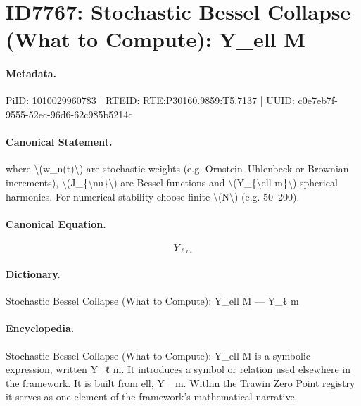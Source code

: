 \section*{ID7767: Stochastic Bessel Collapse (What to Compute): Y\_ell M}
\paragraph{Metadata.}
PiID: 1010029960783 | RTEID: RTE:P30160.9859:T5.7137 | UUID: c0e7eb7f-9555-52ec-96d6-62c985b5214c

\paragraph{Canonical Statement.}
where \textbackslash{}(w\_n(t)\textbackslash{}) are stochastic weights (e.g. Ornstein–Uhlenbeck or Brownian increments), \textbackslash{}(J\_\{\textbackslash{}nu\}\textbackslash{}) are Bessel functions and \textbackslash{}(Y\_\{\textbackslash{}ell m\}\textbackslash{}) spherical harmonics. For numerical stability choose finite \textbackslash{}(N\textbackslash{}) (e.g. 50–200).

\paragraph{Canonical Equation.}
\[
Y_{\ell m}
\]

\paragraph{Dictionary.}
Stochastic Bessel Collapse (What to Compute): Y\_ell M — Y\_ℓ m

\paragraph{Encyclopedia.}
Stochastic Bessel Collapse (What to Compute): Y\_ell M is a symbolic expression, written Y\_ℓ m. It introduces a symbol or relation used elsewhere in the framework. It is built from ell, Y\_ m. Within the Trawin Zero Point registry it serves as one element of the framework's mathematical narrative.
